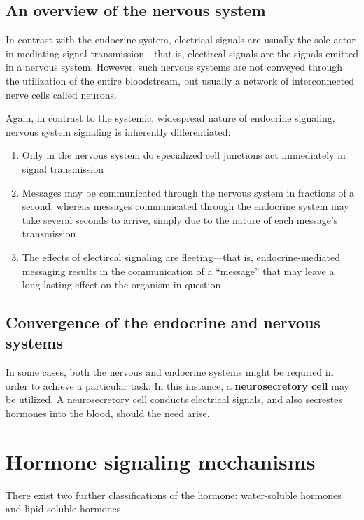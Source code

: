 \documentclass{article}
\begin{document}
\subsection{An overview of the nervous system}

In contrast with the endocrine system, electrical signals are usually the sole
actor in mediating signal transmission---that is, electircal signals are the signals
emitted in a nervous system. However, such nervous systems are not conveyed
through the utilization of the entire bloodstream, but usually a network of
interconnected nerve cells called neurons.

Again, in contrast to the systemic, widespread nature of endocrine signaling,
nervous system signaling is inherently differentiated:

\begin{enumerate}
	\item Only in the nervous system do specialized cell junctions act immediately in signal transmission
	\item Messages may be communicated through the nervous system in fractions of a second,
		whereas messages communicated through the endocrine system may take several seconds
		to arrive, simply due to the nature of each message's transmission
	\item The effects of electircal signaling are fleeting---that is, endocrine-mediated messaging
		results in the communication of a ``message'' that may leave a long-lasting effect on the organism in
		question
\end{enumerate}

\subsection{Convergence of the endocrine and nervous systems}

In some cases, both the nervous and endocrine systems might be requried in order
to achieve a particular task. In this instance, a \textbf{neurosecretory cell}
may be utilized. A neurosecretory cell conducts electrical signals, and also
secrestes hormones into the blood, should the need arise.

\section{Hormone signaling mechanisms}

There exist two further classifications of the hormone: water-soluble hormones
and lipid-soluble hormones.
\end{document}
